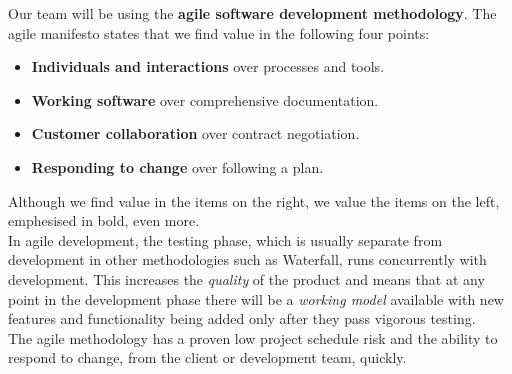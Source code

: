 \begin{flushleft}
Our team will be using the \textbf{agile software development methodology}. The agile manifesto states that we find value in the following four points:\\
\begin{itemize}
	\item \textbf{Individuals and interactions} over processes and tools.
	\item \textbf{Working software} over comprehensive documentation.
	\item \textbf{Customer collaboration} over contract negotiation.
	\item \textbf{Responding to change} over following a plan.
\end{itemize}
Although we find value in the items on the right, we value the items on the left, emphesised in bold, even more.\\
In agile development, the testing phase, which is usually separate from development in other methodologies such as Waterfall, runs concurrently with development. This increases the \emph{quality} of the product and means that at any point in the development phase there will be a \emph{working model} available with new features and functionality being added only after they pass vigorous testing.\\
The agile methodology has a proven low project schedule risk and the ability to respond to change, from the client or development team, quickly.
\end{flushleft}